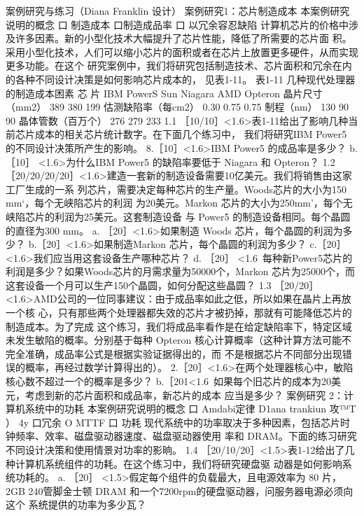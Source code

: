案例研究与练习（Diana Franklin 设计）
案例研究1：芯片制造成本
本案例研究说明的概念
口 制造成本
口制造成品率
口 以冗余容忍缺陷
计算机芯片的价格中涉及许多因素。新的小型化技术大幅提升了芯片性能，降低了所需要的芯片面
积。采用小型化技术，人们可以缩小芯片的面积或者在芯片上放置更多硬件，从而实现更多功能。在这个
研究案例中，我们将研究包括制造技术、芯片面积和冗余在内的各种不同设计决策是如何影响芯片成本的，
见表1-11。
表1-11 几种现代处理器的制造成本困素
芯
片
IBM PowerS
Sun Niagara
AMD Opteron
晶片尺寸（mm2）
389
380
199
估测缺陷率（每cm2）
0.30
0.75
0.75
制程（nm）
130
90
90
晶体管数（百万个）
276
279
233
1.1
［10/10］<1.6>表1-11给出了影响几种当前芯片成本的相关芯片统计数字。在下面几个练习中，
我们将研究IBM Power5 的不同设计决策所产生的影响。
8.［10］<1.6>IBM Power5 的成品率是多少？
b.［10］ <1.6>为什么IBM Power5 的缺陷率要低于 Niagara 和 Opteron？
1.2
［20/20/20/20］<1.6>建造一套新的制造设备需要10亿美元。我们将销售由这家工厂生成的一系
列芯片，需要决定每种芯片的生产量。Woods芯片的大小为150 mm‘，每个无峡陷芯片的利润
为20美元。Markon 芯片的大小为250mm’，每个无峡陷芯片的利润为25美元。这套制造设备
与 Power5 的制造设备相同。每个晶圆的直径为300 mm。
a. ［20］<1.6>如果制造 Woods 芯片，每个晶圆的利润为多少？
b.［20］<1.6>如果制造Markon 芯片，每个晶圆的利润为多少？
c.［20］<1.6>我们应当用这套设备生产哪种芯片？
d. ［20］ <1.6~每种新Power5芯片的利润是多少？如果Woods芯片的月需求量为50000个，Markon
芯片为25000个，而这套设备一个月可以生产150个晶圆，如何分配这些晶圆？
1.3
［20/20］<1.6>AMD公司的一位同事建议：由于成品率如此之低，所以如果在晶片上再放一个核
心，只有那些两个处理器都失效的芯片才被扔掉，那就有可能降低芯片的制造成本。为了完成
这个练习，我们将成品率看作是在给定缺陷率下，特定区域未发生敏陷的概率。分别基于每种
Opteron 核心计算概率（这种计算方法可能不完全准确，成品率公式是根据实验证据得出的，而
不是根据芯片不同部分出现错误的概率，再经过数学计算得出的）。
2.［20］<1.6>在两个处理器核心中，敏陷核心数不超过一个的概率是多少？
b.［201<1.6~如果每个旧芯片的成本为20美元，考虑到新的芯片面积和成品率，新芯片的成本
应当是多少？
案例研究 2：计算机系统中的功耗
本案例研究说明的概念
口 Amdabi定律
D1ana trankiun 攻™T ）
4y
口冗余
O MTTF
口 功耗
现代系统中的功率取决于多种因素，包括芯片时钟频率、效率、磁盘驱动器速度、磁盘驱动器使用
率和 DRAM。下面的练习研究不同设计决策和使用情景对功率的影晌。
1.4
［20/10/20］<1.5>表1-12给出了几种计算机系统组件的功耗。在这个练习中，我们将研究硬盘驱
动器是如何影响系统功耗的。
a. ［20］ <1.5>假定每个组件的负载最大，且电源效率为 80%
片，2GB 240管脚金士顿 DRAM 和一个7200rpm的硬盘驱动器，问服务器电源必须向这个
系统提供的功率为多少瓦？
